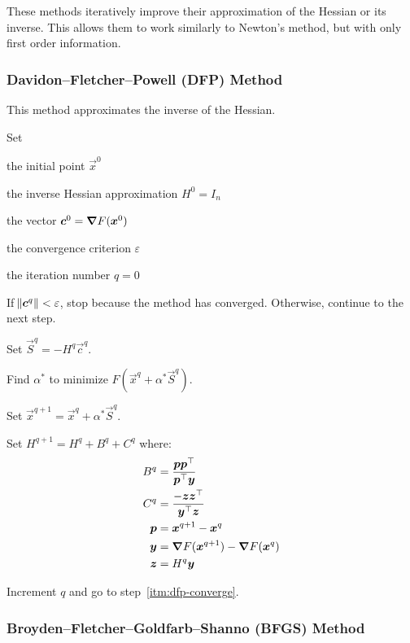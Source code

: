 \documentclass{article}
\begin{document}
These methods iteratively improve their approximation of the Hessian or its inverse. This allows
them to work similarly to Newton's method, but with only first order information.

\subsubsection{Davidon--Fletcher--Powell (DFP) Method}

This method approximates the inverse of the Hessian.

\begin{enumerate*}
\item Set
  \begin{itemize*}
  \item the initial point \(\vec{x}^0\)
  \item the inverse Hessian approximation \(H^0 = I_n\)
  \item the vector \(\bm{c}^0 = \bm{\nabla} F(\bm{x}^0)\)
  \item the convergence criterion \(\varepsilon\)
  \item the iteration number \(q = 0\)
  \end{itemize*}
\item \label{itm:dfp-converge} If \(\norm{\bm{c}^q} < \varepsilon\), stop because the method has converged. Otherwise,
  continue to the next step.
\item Set \(\vec{S}^q = -H^q \vec{c}^q\).
\item Find \(\alpha^*\) to minimize \(F(\vec{x}^q + \alpha^* \vec{S}^q)\).
\item Set \(\vec{x}^{q+1} = \vec{x}^q + \alpha^* \vec{S}^q\).
\item Set \(H^{q+1} = H^q + B^q + C^q\) where:
  \begin{align*}
    B^q &= \frac{\bm{p}{{\bm{p}}^\top}}{{{\bm{p}}^\top}\bm{y}} \\
    C^q &= \frac{-\bm{z}{{\bm{z}}^\top}}{{{\bm{y}}^\top}\bm{z}} \\
    \bm{p} &= \bm{x}^{q+1} - \bm{x}^q \\
    \bm{y} &= \bm{\nabla} F(\bm{x}^{q+1}) - \bm{\nabla} F(\bm{x}^q) \\
    \bm{z} &= H^q \bm{y}
  \end{align*}
\item Increment \(q\) and go to step~\ref{itm:dfp-converge}.
\end{enumerate*}

\subsubsection{Broyden--Fletcher--Goldfarb--Shanno (BFGS) Method}
\end{document}
